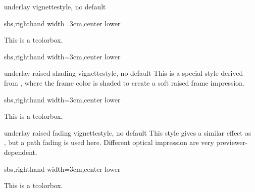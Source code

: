 \begin{docTcbKey}[][doc new=2016-04-22]{underlay vignette}{}{style, no default}
\begin{dispExample*}{sbs,righthand width=3cm,center lower}
\begin{tcolorbox}[enhanced,size=small,sharp corners,
  colback=red!50!yellow,frame hidden,boxrule=2mm,
  underlay vignette={color from=red!50!yellow to white,
     draw method=clipped,size=2.1mm}]
    This is a tcolorbox.
\end{tcolorbox}
\end{dispExample*}

\begin{dispExample*}{sbs,righthand width=3cm,center lower}

\end{dispExample*}

\end{docTcbKey}


\clearpage
\begin{docTcbKey}[][doc new=2016-04-22]{underlay raised shading vignette}{}{style, no default}
  This is a special style derived from ,
  where the frame color is shaded to create a soft raised frame impression.

\begin{dispExample*}{sbs,righthand width=3cm,center lower}
\begin{tcolorbox}[enhanced,sharp corners,
  colback=green!10,
  colframe=green!50!black,
  size=small,boxrule=2mm,titlerule=0mm,
  title=My title,center title,fonttitle=\bfseries,
  underlay raised shading vignette]
    This is a tcolorbox.
\end{tcolorbox}
\end{dispExample*}
\end{docTcbKey}



\begin{docTcbKey}[][doc new=2016-04-22]{underlay raised fading vignette}{}{style, no default}
  This style gives a similar effect as ,
  but a path fading is used here. Different optical impression are very
  previewer-dependent.
\begin{dispExample*}{sbs,righthand width=3cm,center lower}
\begin{tcolorbox}[enhanced,sharp corners,
  colback=green!10,
  colframe=green!50!black,
  size=small,boxrule=2mm,titlerule=0mm,
  title=My title,center title,fonttitle=\bfseries,
  underlay raised fading vignette]
    This is a tcolorbox.
\end{tcolorbox}
\end{dispExample*}
\end{docTcbKey}

